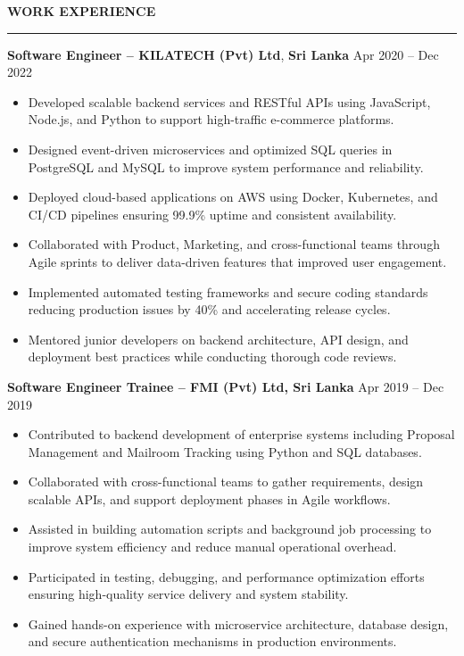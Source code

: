 \documentclass[10pt,letterpaper]{article}
\begin{document}
\vspace{8pt}

\textbf{WORK EXPERIENCE}\\[-8pt]
\noindent\rule{\textwidth}{1pt}

\vspace{-2pt}

\textbf{Software Engineer -- KILATECH (Pvt) Ltd}, \textbf{Sri Lanka} \hfill Apr 2020 -- Dec 2022

\vspace{-1pt}

\begin{itemize}
\item Developed scalable backend services and RESTful APIs using JavaScript, Node.js, and Python to support high-traffic e-commerce platforms.
\item Designed event-driven microservices and optimized SQL queries in PostgreSQL and MySQL to improve system performance and reliability.
\item Deployed cloud-based applications on AWS using Docker, Kubernetes, and CI/CD pipelines ensuring 99.9\% uptime and consistent availability.
\item Collaborated with Product, Marketing, and cross-functional teams through Agile sprints to deliver data-driven features that improved user engagement.
\item Implemented automated testing frameworks and secure coding standards reducing production issues by 40\% and accelerating release cycles.
\item Mentored junior developers on backend architecture, API design, and deployment best practices while conducting thorough code reviews.
\end{itemize}

\textbf{Software Engineer Trainee -- FMI (Pvt) Ltd, Sri Lanka} \hfill Apr 2019 -- Dec 2019

\vspace{-1pt}

\begin{itemize}
\item Contributed to backend development of enterprise systems including Proposal Management and Mailroom Tracking using Python and SQL databases.
\item Collaborated with cross-functional teams to gather requirements, design scalable APIs, and support deployment phases in Agile workflows.
\item Assisted in building automation scripts and background job processing to improve system efficiency and reduce manual operational overhead.
\item Participated in testing, debugging, and performance optimization efforts ensuring high-quality service delivery and system stability.
\item Gained hands-on experience with microservice architecture, database design, and secure authentication mechanisms in production environments.
\end{itemize}
\end{document}
